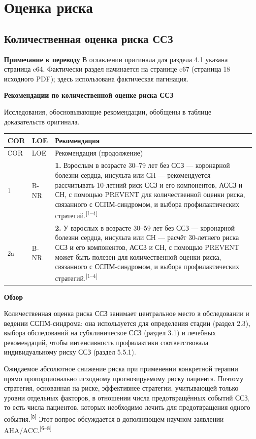 \documentclass[11pt,a4paper]{article}
\newcommand{\src}[1]{\textsuperscript{[#1]}}
\newcommand{\editorial}[1]{\par\begingroup\small\color{black!70}\textbf{Примечание к переводу} #1\par\endgroup}
\newcommand{\heading}[1]{\par\medskip\textbf{#1}\par}
\begin{document}
\section{Оценка риска}
\subsection{Количественная оценка риска ССЗ}
\editorial{В оглавлении оригинала для раздела 4.1 указана страница e64. Фактически раздел начинается на странице e67 (страница 18 исходного PDF); здесь использована фактическая пагинация.}
\heading{Рекомендации по количественной оценке риска ССЗ}
Исследования, обосновывающие рекомендации, обобщены в таблице доказательств оригинала.
{\small
\begin{longtable}{P{0.07\textwidth}P{0.11\textwidth}P{0.75\textwidth}}
\toprule COR & LOE & Рекомендация\\\midrule
\endfirsthead
\toprule COR & LOE & Рекомендация (продолжение)\\\midrule
{} & B-NR & \textbf{1.} Взрослым в возрасте 30--79 лет без ССЗ --- коронарной болезни сердца, инсульта или СН --- рекомендуется рассчитывать 10-летний риск ССЗ и его компонентов, АССЗ и СН, с помощью PREVENT для количественной оценки риска, связанного с ССПМ-синдромом, и выбора профилактических стратегий.\src{1--4}\\[5pt]
2a & B-NR & \textbf{2.} У взрослых в возрасте 30--59 лет без ССЗ --- коронарной болезни сердца, инсульта или СН --- расчёт 30-летнего риска ССЗ и его компонентов, АССЗ и СН, с помощью PREVENT может быть полезен для количественной оценки риска, связанного с ССПМ-синдромом, и выбора профилактических стратегий.\src{1--4}\\
\bottomrule
\end{longtable}
}

\heading{Обзор}
Количественная оценка риска ССЗ занимает центральное место в обследовании и ведении ССПМ-синдрома: она используется для определения стадии (раздел 2.3), выбора обследований на субклиническое ССЗ (раздел 3.1) и лечебных рекомендаций, чтобы интенсивность профилактики соответствовала индивидуальному риску ССЗ (раздел 5.5.1).

Ожидаемое абсолютное снижение риска при применении конкретной терапии прямо пропорционально исходному прогнозируемому риску пациента. Поэтому стратегия, основанная на риске, эффективнее стратегии, учитывающей только уровни отдельных факторов, в отношении числа предотвращённых событий ССЗ, то есть числа пациентов, которых необходимо лечить для предотвращения одного события.\src{5} Этот вопрос обсуждается в дополняющем научном заявлении AHA/ACC.\src{6--8}
\end{document}
